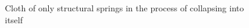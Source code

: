 \begin{figure}
    \centering
    \caption{Cloth of only structural springs in the process of collapsing into itself}
    \label{fig:structural_springs_collapsing}
\end{figure}


